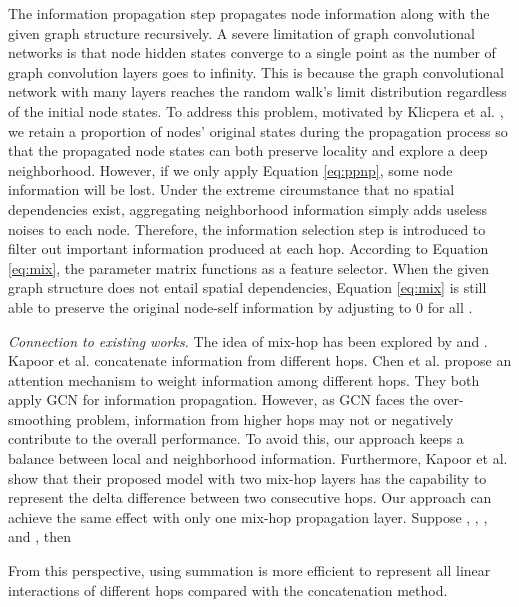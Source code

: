 \documentclass[sigconf]{acmart}
\begin{document}
The information propagation step propagates node information along with the given graph structure recursively.  A severe limitation of graph convolutional networks is that node hidden states converge to a single point as the number of graph convolution layers goes to infinity. This is because the graph convolutional network with many layers reaches the random walk's limit distribution regardless of the initial node states.  To address this problem,  motivated by Klicpera et al. \cite{klicpera2019predict}, we retain a proportion of nodes' original states during the propagation process so that the propagated node states can both preserve locality and explore a deep neighborhood. However, if we only apply Equation \ref{eq:ppnp}, some node information will be lost. Under the extreme circumstance that no spatial dependencies exist, aggregating neighborhood information simply adds useless noises to each node. Therefore, the information selection step is introduced to filter out important information produced at each hop. According to Equation \ref{eq:mix}, the parameter matrix  functions as a feature selector. When the given graph structure does not entail spatial dependencies, Equation \ref{eq:mix} is still able to preserve the original node-self information by adjusting  to 0 for all .

\textit{Connection to existing works.} The idea of mix-hop has been explored by \cite{kapoor2019mixhop} and \cite{chen2019dagcn}. Kapoor et al. \cite{kapoor2019mixhop} concatenate information from different hops. Chen et al. \cite{chen2019dagcn} propose an attention mechanism to weight information among different hops. They both apply GCN for information propagation. However, as GCN faces the over-smoothing problem, information from higher hops may not or negatively contribute to the overall performance.  To avoid this, our approach keeps a balance between local and neighborhood information.  Furthermore, Kapoor et al. \cite{kapoor2019mixhop} show that their proposed model with two mix-hop layers has the capability to represent the delta difference between two consecutive hops. Our approach can achieve the same effect with only one mix-hop propagation layer. Suppose , , , and ,  then

From this perspective, using summation is more efficient to represent all linear interactions of different hops compared with the concatenation method.
\end{document}
